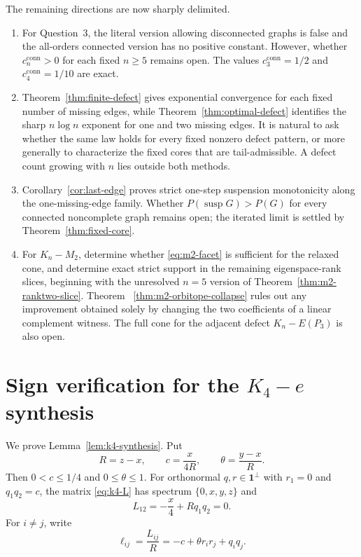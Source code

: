 \documentclass[11pt,reqno]{amsart}
\theoremstyle{definition}
\theoremstyle{remark}
\newcommand{\one}{\mathbf 1}
\newcommand{\susp}{\operatorname{susp}}
\begin{document}
The remaining directions are now sharply delimited.
\begin{enumerate}[label=\textup{(\roman*)}]
\item For Question~3, the literal version allowing disconnected graphs is
false and the all-orders connected version has no positive constant.
However, whether $c_n^{\mathrm{conn}}>0$ for each fixed $n\ge5$ remains
open.  The values $c_3^{\mathrm{conn}}=1/2$ and
$c_4^{\mathrm{conn}}=1/10$ are exact.

\item Theorem~\ref{thm:finite-defect} gives exponential convergence for each
fixed number of missing edges, while Theorem~\ref{thm:optimal-defect}
identifies the sharp $n\log n$ exponent for one and two missing edges.  It is
natural to ask whether the same law holds for every fixed nonzero defect
pattern, or more generally to characterize the fixed cores that are
tail-admissible.  A defect count growing with $n$ lies outside both methods.

\item Corollary~\ref{cor:last-edge} proves strict one-step suspension
monotonicity along the one-missing-edge family.  Whether
$P(\susp G)>P(G)$ for every connected noncomplete graph remains open; the
iterated limit is settled by Theorem~\ref{thm:fixed-core}.

\item For $K_n-M_2$, determine whether \eqref{eq:m2-facet} is sufficient for
the relaxed cone, and determine exact strict support in the remaining
eigenspace-rank slices, beginning with the unresolved $n=5$ version of
Theorem~\ref{thm:m2-ranktwo-slice}.  Theorem~
\ref{thm:m2-orbitope-collapse} rules out any improvement obtained solely by
changing the two coefficients of a linear complement witness.  The full
cone for the adjacent defect $K_n-E(P_3)$ is also open.
\end{enumerate}

\appendix

\section{Sign verification for the \texorpdfstring{$K_4-e$}{K4-e} synthesis}\label{app:k4-signs}

We prove Lemma~\ref{lem:k4-synthesis}.  Put
\[
  R=z-x,\qquad c=\frac{x}{4R},\qquad
  \theta=\frac{y-x}{R}.
\]
Then $0<c\le1/4$ and $0\le\theta\le1$.  For orthonormal
$q,r\in\one^\perp$ with $r_1=0$ and $q_1q_2=c$, the matrix
\eqref{eq:k4-L} has spectrum $\{0,x,y,z\}$ and
\[
  L_{12}=-\frac{x}{4}+Rq_1q_2=0.
\]
For $i\ne j$, write
\begin{equation}\label{eq:ell-ij}
  \ell_{ij}=\frac{L_{ij}}R=-c+\theta r_ir_j+q_iq_j.
\end{equation}
\end{document}
